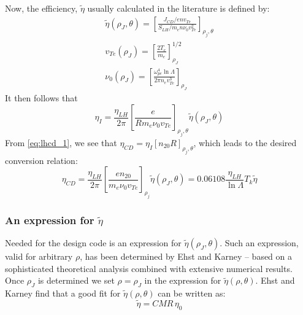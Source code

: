 Now, the efficiency, $\tilde \eta$ usually calculated in the literature is defined by:
\begin{gather}
	\tilde { \eta } \left( \rho _ { J } , \theta \right) = \left[ \frac { J _ { C D } / e n v _ { Te } } { S _ { L H } / m _ { e } n \nu _ { 0 } v _ { T e } ^ { 2 } } \right] _ { \rho _ { j } , \theta } \\
	v _ { Te } \left( \rho _ { J } \right) = \left[ \frac { 2 T _ { e } } { m _ { e } } \right] _ { \rho _ { J } } ^ { 1 / 2 } \\
	\nu _ { 0 } \left( \rho _ { J } \right) = \left[ \frac { \omega _ { p e } ^ { 4 } \ln \Lambda } { 2 \pi n _ { e } v _ { T e } ^ { 3 } } \right] _ { \rho _ { J } }
\end{gather}
It then follows that
\begin{equation}
	\eta _ { I } = \frac { \eta _ { L H } } { 2 \pi } \left[ \frac { e } { R m _ { e } \nu _ { 0 } v _ { T e } } \right] _ { \rho _ { j } , \theta } \tilde { \eta } \left( \rho _ { J } , \theta \right)
\end{equation}
From \cref{eq:lhcd_1}, we see that $\eta _ { C D } = \eta _ { I } \left[ n _ { 20 } R \right] _ { \rho _ { j } , \theta }$, which leads to the desired conversion relation:
\begin{equation}
	\eta _ { C D } = \frac { \eta _ { L H } } { 2 \pi } \left[ \frac { e n _ { 20 } } { m _ { e } \nu _ { 0 } v _ { Te } } \right] _ { \rho _ { j } } \tilde { \eta } \left( \rho _ { J } , \theta \right) = 0.06108 \frac { \eta _ { L H } } { \ln \Lambda } T _ { k } \tilde { \eta }
\end{equation}

\subsubsection{An expression for $\tilde \eta$}

Needed for the design code is an expression for $\tilde \eta(\rho_J, \theta)$. Such an expression, valid for arbitrary $\rho$, has been determined by Ehst and Karney\cite{ehstkarney} -- based on a sophisticated theoretical analysis combined with extensive numerical results. Once $\rho_J$ is determined we set $\rho = \rho_J$ in the expression for $\tilde \eta(\rho,\theta).$ Ehst and Karney find that a good fit for $\tilde \eta(\rho,\theta)$ can be written as:
\begin{equation}
	\label{eq:lhcd_2}
	\tilde { \eta } = C M R \, \eta _ { 0 }
\end{equation}

